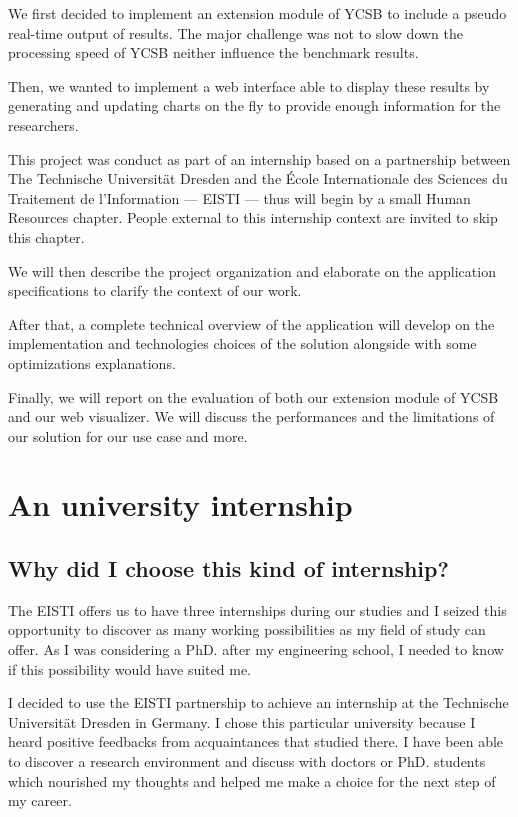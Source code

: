 \documentclass[a4paper,11pt]{report}
\begin{document}
We first decided to implement an extension module of YCSB to include a pseudo real-time output of results. The major challenge was not to slow down the processing speed of YCSB neither influence the benchmark results. 

Then, we wanted to implement a web interface able to display these results by generating and updating charts on the fly to provide enough information for the researchers.

\bigskip

This project was conduct as part of an internship based on a partnership between The Technische Universität Dresden and the École Internationale des Sciences du Traitement de l'Information --- EISTI --- thus will begin by a small Human Resources chapter. People external to this internship context are invited to skip this chapter.

We will then describe the project organization and elaborate on the application specifications to clarify the context of our work.

After that, a complete technical overview of the application will develop on  the implementation and technologies choices of the solution alongside with some optimizations explanations.

Finally, we will report on the evaluation of both our extension module of YCSB and our web visualizer. We will discuss the performances and the limitations of our solution for our use case and more.

\newpage

\chapter{An university internship}\label{partnership}

\section{Why did I choose this kind of internship?}

The EISTI offers us to have three internships during our studies and I seized this opportunity to discover as many working possibilities as my field of study can offer. As I was considering a PhD. after my engineering school, I needed to know if this possibility would have suited me.

\bigskip

I decided to use the EISTI partnership to achieve an internship at the Technische Universität Dresden in Germany. I chose this particular university because I heard positive feedbacks from acquaintances that studied there. I have been able to discover a research environment and discuss with doctors or PhD. students which nourished my thoughts and helped me make a choice for the next step of my career.
\end{document}
